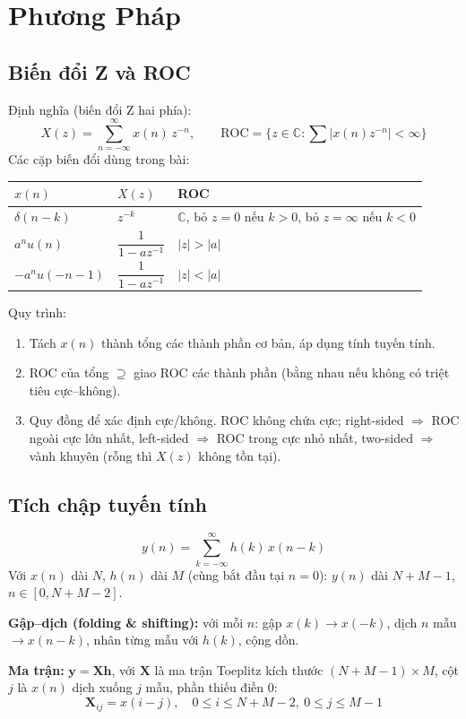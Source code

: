 \section{Phương Pháp}

\subsection{Biến đổi Z và ROC}
Định nghĩa (biến đổi Z hai phía):
\[
X(z) = \sum_{n=-\infty}^{\infty} x(n)\,z^{-n}, \qquad \text{ROC} = \{ z \in \mathbb{C} : \textstyle\sum |x(n)z^{-n}| < \infty \}
\]
Các cặp biến đổi dùng trong bài:
\begin{center}
\begin{tabular}{lll}
\hline
$x(n)$ & $X(z)$ & ROC \\
\hline
$\delta(n-k)$ & $z^{-k}$ & $\mathbb{C}$, bỏ $z=0$ nếu $k>0$, bỏ $z=\infty$ nếu $k<0$ \\
$a^n u(n)$ & $\dfrac{1}{1-az^{-1}}$ & $|z| > |a|$ \\
$-a^n u(-n-1)$ & $\dfrac{1}{1-az^{-1}}$ & $|z| < |a|$ \\
\hline
\end{tabular}
\end{center}
Quy trình:
\begin{enumerate}
    \item Tách $x(n)$ thành tổng các thành phần cơ bản, áp dụng tính tuyến tính.
    \item ROC của tổng $\supseteq$ giao ROC các thành phần (bằng nhau nếu không có triệt tiêu cực--không).
    \item Quy đồng để xác định cực/không. ROC không chứa cực; right-sided $\Rightarrow$ ROC ngoài cực lớn nhất, left-sided $\Rightarrow$ ROC trong cực nhỏ nhất, two-sided $\Rightarrow$ vành khuyên (rỗng thì $X(z)$ không tồn tại).
\end{enumerate}

\subsection{Tích chập tuyến tính}
\[
y(n) = \sum_{k=-\infty}^{\infty} h(k)\,x(n-k)
\]
Với $x(n)$ dài $N$, $h(n)$ dài $M$ (cùng bắt đầu tại $n=0$): $y(n)$ dài $N+M-1$, $n \in [0, N+M-2]$.

\noindent\textbf{Gập--dịch (folding \& shifting):} với mỗi $n$: gập $x(k) \to x(-k)$, dịch $n$ mẫu $\to x(n-k)$, nhân từng mẫu với $h(k)$, cộng dồn.

\noindent\textbf{Ma trận:} $\mathbf{y} = \mathbf{X}\mathbf{h}$, với $\mathbf{X}$ là ma trận Toeplitz kích thước $(N+M-1) \times M$, cột $j$ là $x(n)$ dịch xuống $j$ mẫu, phần thiếu điền 0:
\[
\mathbf{X}_{ij} = x(i-j), \quad 0 \le i \le N+M-2,\ 0 \le j \le M-1
\]

